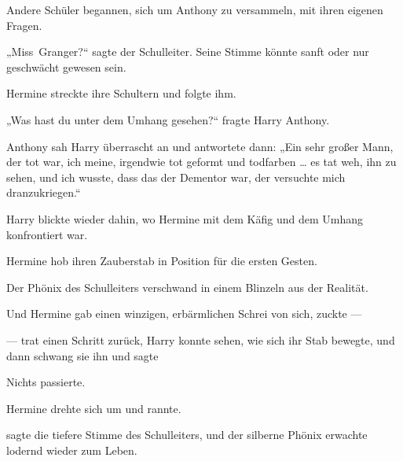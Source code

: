 Andere Schüler begannen, sich um Anthony zu versammeln, mit ihren eigenen Fragen.

„Miss~Granger?“ sagte der Schulleiter. Seine Stimme könnte sanft oder nur geschwächt gewesen sein.

Hermine streckte ihre Schultern und folgte ihm.

„Was hast du unter dem Umhang gesehen?“ fragte Harry Anthony.

Anthony sah Harry überrascht an und antwortete dann:
„Ein sehr großer Mann, der tot war, ich meine, irgendwie tot geformt und todfarben … es tat weh, ihn zu sehen, und ich wusste, dass das der Dementor war, der versuchte mich dranzukriegen.“

Harry blickte wieder dahin, wo Hermine mit dem Käfig und dem Umhang konfrontiert war.

Hermine hob ihren Zauberstab in Position für die ersten Gesten.

Der Phönix des Schulleiters verschwand in einem Blinzeln aus der Realität.

Und Hermine gab einen winzigen, erbärmlichen Schrei von sich, zuckte —

— trat einen Schritt zurück, Harry konnte sehen, wie sich ihr Stab bewegte, und dann schwang sie ihn und sagte 

Nichts passierte.

Hermine drehte sich um und rannte.

 sagte die tiefere Stimme des Schulleiters, und der silberne Phönix erwachte lodernd wieder zum Leben.

